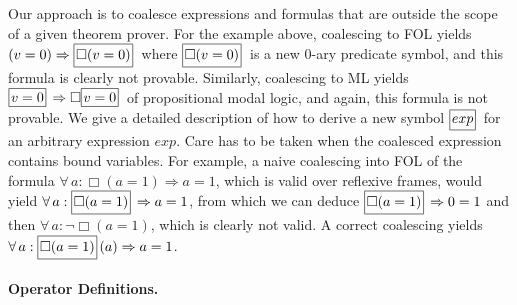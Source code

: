 \documentclass{easychair}
\renewcommand{\implies}{\Rightarrow}
\newcommand{\B}[1]{\framebox{\rule{0pt}{.6em}\ensuremath{\!\tlachars #1\!}}\,}
\let\tlachars\relax
\def\A{\forall\,}
\begin{document}
Our approach is to coalesce expressions and formulas that are outside
the scope of a given theorem prover.  For the example above, coalescing
to FOL yields
\(  (v = 0) \implies \B{\Box(v=0)} \)
where $\B{\Box(v=0)}$ is a new $0$-ary predicate symbol, and this formula is
clearly not provable.
Similarly, coalescing to ML yields
\(  \B{v=0} \implies \Box\B{v=0}  \)
of propositional modal logic, and again, this formula is not provable.
We give a
detailed description of how to derive a new symbol $\B{exp}$ for an
arbitrary expression $exp$.  Care has to be taken when the coalesced expression
contains bound variables.
For example, a naive coalescing into FOL of the formula
  \mbox{$\A a : \Box(a=1) \implies a=1$},
which is valid over reflexive frames, would yield
  \mbox{$\A a : \B{\Box(a=1)} \implies a=1$},
from which we can deduce $\B{\Box(a=1)} \implies 0=1$ and then
  \mbox{$\A a: \lnot\Box(a=1)$},
which is clearly not valid. A correct coalescing yields
  \mbox{$\A a : \B{\Box(a=1)}(a) \implies a=1$}.


\paragraph{Operator Definitions.}
\end{document}
